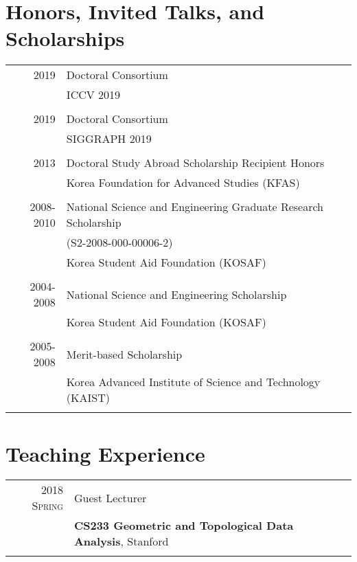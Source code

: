 \documentclass[letterpaper,10pt]{article} %
\newcommand{\blankline}{\quad\pagebreak[2]}
\begin{document}
{\section{Honors, Invited Talks, and Scholarships}

\begin{tabular}{rl}
2019 & Doctoral Consortium\\
& ICCV 2019\\
&\\
2019 & Doctoral Consortium\\
& SIGGRAPH 2019\\
&\\
2013 & Doctoral Study Abroad Scholarship Recipient Honors\\
& Korea Foundation for Advanced Studies (KFAS)\\
&\\
2008-2010 & National Science and Engineering Graduate Research Scholarship\\
& (S2-2008-000-00006-2)\\
& Korea Student Aid Foundation (KOSAF)\\
&\\
2004-2008 & National Science and Engineering Scholarship \\
& Korea Student Aid Foundation (KOSAF)\\
&\\
2005-2008 & Merit-based Scholarship\\
& Korea Advanced Institute of Science and Technology (KAIST)\\
&\\
\end{tabular}

\blankline


\section{Teaching Experience}

\begin{tabular}{r|p{11cm}}
\textsc{2018 Spring} & Guest Lecturer\\
& \textbf{CS233 Geometric and Topological Data Analysis}, Stanford\\
& \\


\end{tabular}}
\end{document}
